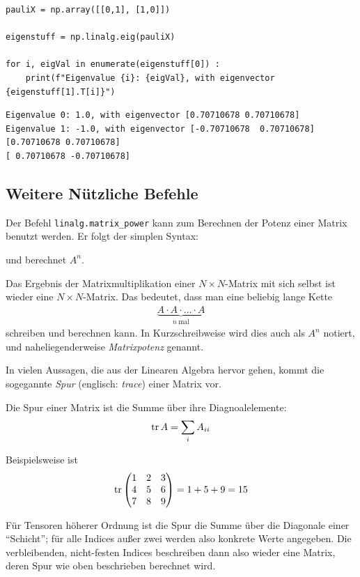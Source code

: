 \begin{codebox}
\begin{verbatim}
pauliX = np.array([[0,1], [1,0]])

eigenstuff = np.linalg.eig(pauliX)

for i, eigVal in enumerate(eigenstuff[0]) :
    print(f"Eigenvalue {i}: {eigVal}, with eigenvector {eigenstuff[1].T[i]}")
\end{verbatim}
\end{codebox}
%
\begin{cmdbox}
\begin{verbatim}
Eigenvalue 0: 1.0, with eigenvector [0.70710678 0.70710678]
Eigenvalue 1: -1.0, with eigenvector [-0.70710678  0.70710678]
[0.70710678 0.70710678]
[ 0.70710678 -0.70710678]
\end{verbatim}
\end{cmdbox}

\subsection{Weitere Nützliche Befehle}
Der Befehl \texttt{linalg.matrix\_power} kann zum Berechnen der Potenz einer Matrix benutzt werden. Er folgt der simplen Syntax:
\begin{center}
\end{center}
und berechnet $A^n$.

\begin{hintbox}
Das Ergebnis der Matrixmultiplikation einer $N \times N$-Matrix mit sich selbst ist wieder eine $N \times N$-Matrix. Das bedeutet, dass man eine beliebig lange Kette
\begin{align*}
	\underbrace{A \cdot A \cdot \ldots \cdot A}_{n~\text{mal}}
\end{align*}
schreiben und berechnen kann. In Kurzschreibweise wird dies auch als $A^n$ notiert, und naheliegenderweise \emph{Matrixpotenz} genannt.
\end{hintbox}

In vielen Aussagen, die aus der Linearen Algebra hervor gehen, kommt die sogegannte \emph{Spur} (englisch: \emph{trace}) einer Matrix vor.
\begin{hintbox}
Die Spur einer Matrix ist die Summe über ihre Diagnoalelemente:
\[ \tr A = \sum_i A_{ii} \]

Beispielsweise ist
\[ \tr \begin{pmatrix}
	1 & 2 & 3 \\
	4 & 5 & 6 \\
	7 & 8 & 9
\end{pmatrix}
=
	1 + 5 + 9
=
	15 \]

Für Tensoren höherer Ordnung ist die Spur die Summe über die Diagonale einer \enquote{Schicht}; für alle Indices außer zwei werden also konkrete Werte angegeben. Die verbleibenden, nicht-festen Indices beschreiben dann also wieder eine Matrix, deren Spur wie oben beschrieben berechnet wird.
\end{hintbox}

